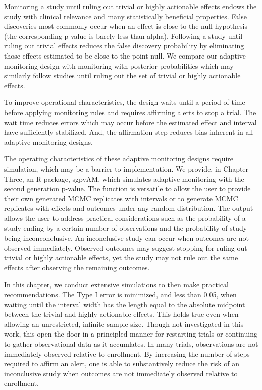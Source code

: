 \documentclass[12pt,oneside]{book}
\newlength{\li}\setlength{\li}{14.48pt}
\newlength{\di}\setlength{\di}{-3.5mm}
\theoremstyle{definition}
\theoremstyle{definition}
\theoremstyle{definition}
\theoremstyle{remark}
\begin{document}
Monitoring a study until ruling out trivial or highly actionable effects
endows the study with clinical relevance and many statistically
beneficial properties. False discoveries most commonly occur when an
effect is close to the null hypothesis (the corresponding p-value is
barely less than alpha). Following a study until ruling out trivial
effects reduces the false discovery probability by eliminating those
effects estimated to be close to the point null. We compare our adaptive
monitoring design with monitoring with posterior probabilities which may
similarly follow studies until ruling out the set of trivial or highly
actionable effects.

To improve operational characteristics, the design waits until a period
of time before applying monitoring rules and requires affirming alerts
to stop a trial. The wait time reduces errors which may occur before the
estimated effect and interval have sufficiently stabilized. And, the
affirmation step reduces bias inherent in all adaptive monitoring
designs.

The operating characteristics of these adaptive monitoring designs
require simulation, which may be a barrier to implementation. We
provide, in Chapter Three, an R package, sgpvAM, which simulates
adaptive monitoring with the second generation p-value. The function is
versatile to allow the user to provide their own generated MCMC
replicates with intervals or to generate MCMC replicates with effects
and outcomes under any random distribution. The output allows the user
to address practical considerations such as the probability of a study
ending by a certain number of observations and the probability of study
being inconconclusive. An inconclusive study can occur when outcomes are
not observed immediately. Observed outcomes may suggest stopping for
ruling out trivial or highly actionable effects, yet the study may not
rule out the same effects after observing the remaining outcomes.

In this chapter, we conduct extensive simulations to then make practical
recommendations. The Type I error is minimized, and less than 0.05, when
waiting until the interval width has the length equal to the absolute
midpoint between the trivial and highly actionable effects. This holds
true even when allowing an unrestricted, infinite sample size. Though
not investigated in this work, this open the door in a principled manner
for restarting trials or continuing to gather observational data as it
accumlates. In many trials, observations are not immediately observed
relative to enrollment. By increasing the number of steps required to
affirm an alert, one is able to substantively reduce the risk of an
inconclusive study when outcomes are not immediately observed relative
to enrollment.
\end{document}
